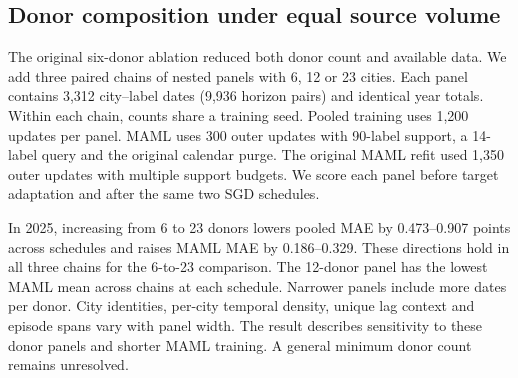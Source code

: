 \subsection{Donor composition under equal source volume}
The original six-donor ablation reduced both donor count and available data. We add three paired chains of nested panels with 6, 12 or 23 cities. Each panel contains 3,312 city--label dates (9,936 horizon pairs) and identical year totals. Within each chain, counts share a training seed. Pooled training uses 1,200 updates per panel. MAML uses 300 outer updates with 90-label support, a 14-label query and the original calendar purge. The original MAML refit used 1,350 outer updates with multiple support budgets. We score each panel before target adaptation and after the same two SGD schedules.

In 2025, increasing from 6 to 23 donors lowers pooled MAE by 0.473--0.907 points across schedules and raises MAML MAE by 0.186--0.329. These directions hold in all three chains for the 6-to-23 comparison. The 12-donor panel has the lowest MAML mean across chains at each schedule. Narrower panels include more dates per donor. City identities, per-city temporal density, unique lag context and episode spans vary with panel width. The result describes sensitivity to these donor panels and shorter MAML training. A general minimum donor count remains unresolved.
